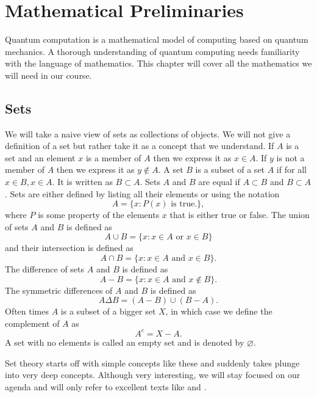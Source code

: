 \chapter{Mathematical Preliminaries}\label{c1}
Quantum computation is a mathematical model of computing based on quantum mechanics.
A thorough understanding of quantum computing needs familiarity with the language of
mathematics. This chapter will cover all the mathematics we will need in our course.
\section{Sets}\label{c1s1}
We will take a naive view of sets as collections of objects. We will not give a 
definition of a set but rather take it as a concept that we understand. If $A$ is a
set and an element $x$ is a member of $A$ then we express it as $x \in A$. If $y$
is not a member of $A$ then we express it as $y \notin A$. A set $B$ is a subset of
a set $A$ if for all $x \in B, x \in A$. It is written as $B \subset A$. Sets $A$ and
$B$ are equal if $A \subset B$ and $B \subset A$. Sets are either defined by listing
all their elements or using the notation
\[
A = \{x : P(x) \text{ is true.}\},
\]
where $P$ is some property of the elements $x$ that is either true or false. The 
union of sets $A$ and $B$ is
defined as
\begin{equation}\label{c1s1e1}
A \cup B = \{x : x \in A \text{ or } x \in B\}
\end{equation}
and their intersection is defined as
\begin{equation}\label{c1s1e2}
A \cap B = \{x : x \in A \text{ and } x \in B\}.
\end{equation}
The difference of sets $A$ and $B$ is defined as
\begin{equation}\label{c1s1e3}
A - B = \{x : x \in A \text{ and } x \notin B\}.
\end{equation}
The symmetric differences of $A$ and $B$ is defined as
\begin{equation}\label{c1s2e4}
A \Delta B = (A - B) \cup (B - A).
\end{equation}
Often times $A$ is a subset of a bigger set $X$, in which case we define
the complement of $A$ as
\begin{equation}\label{c1s2e5}
A^c = X - A.
\end{equation}
A set with no elements is called an empty set and is denoted by $\varnothing$.

Set theory starts off with simple concepts like these and suddenly takes plunge 
into very deep concepts. Although very interesting, we will stay focused on our
agenda and will only refer to excellent texts like \cite{halmos1960naive} and
\cite{lewis1981elements}.

